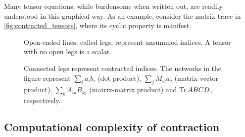 Many tensor equations, while burdensome when written out, are readily
understood in this graphical way. As an example, consider the matrix trace in
\autoref{fig:contracted_tensors}, where its cyclic property is manifest.

\begin{figure}
  
  \caption{Open-ended lines, called legs, represent unsummed indices. A tensor
  with no open legs is a scalar.}
  \label{fig:tensors_graphical_notation}
\end{figure}

\begin{figure}
  
  \caption{Connected legs represent contracted indices. The networks in the
  figure represent $\sum_i a_i b_i$ (dot product), 
  $\sum_j M_{i j} a_j$ (matrix-vector product), $\sum_{k} A_{i k} B_{k
  j}$ (matrix-matrix product) and $\operatorname{Tr} A B C D$, respectively.}
  \label{fig:contracted_tensors}
\end{figure}



\subsection{Computational complexity of contraction}

